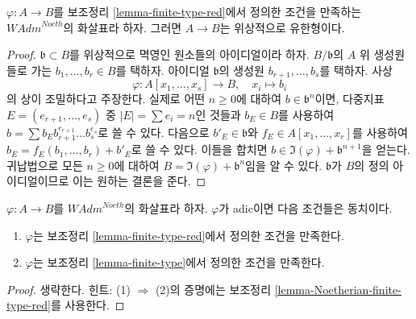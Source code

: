 \begin{lemma}
\label{lemma-Noetherian-finite-type-red}
$\varphi : A \to B$를 보조정리 \ref{lemma-finite-type-red}에서 정의한
조건을 만족하는 $\textit{WAdm}^{Noeth}$의 화살표라 하자.
그러면 $A \to B$는 위상적으로 유한형이다.
\end{lemma}

\begin{proof}
$\mathfrak b \subset B$를 위상적으로 멱영인 원소들의 아이디얼이라 하자.
$B/\mathfrak b$의 $A$ 위 생성원들로 가는 $b_1, \ldots, b_r \in B$를 택하자.
아이디얼 $\mathfrak b$의 생성원 $b_{r + 1}, \ldots, b_s$를 택하자.
사상
$$
\varphi : A[x_1, \ldots, x_s] \longrightarrow B, \quad
x_i \longmapsto b_i
$$
의 상이 조밀하다고 주장한다. 실제로 어떤 $n \geq 0$에 대하여
$b \in \mathfrak b^n$이면, 다중지표
$E = (e_{r + 1}, \ldots, e_s)$ 중 $|E| = \sum e_i = n$인 것들과
$b_E \in B$를 사용하여
$b = \sum b_E b_{r + 1}^{e_{r + 1}} \ldots b_s^{e_s}$로 쓸 수 있다.
다음으로 $b'_E \in \mathfrak b$와 $f_E \in A[x_1, \ldots, x_r]$를 사용하여
$b_E = f_E(b_1, \ldots, b_r) + b'_E$로 쓸 수 있다.
이들을 합치면 $b \in \Im(\varphi) + \mathfrak b^{n + 1}$을 얻는다.
귀납법으로 모든 $n \geq 0$에 대하여
$B = \Im(\varphi) + \mathfrak b^n$임을 알 수 있다.
$\mathfrak b$가 $B$의 정의 아이디얼이므로 이는 원하는 결론을 준다.
\end{proof}

\begin{lemma}
\label{lemma-Noetherian-adic-finite-type-red}
$\varphi : A \to B$를 $\textit{WAdm}^{Noeth}$의 화살표라 하자.
$\varphi$가 adic이면 다음 조건들은 동치이다.
\begin{enumerate}
\item $\varphi$는 보조정리 \ref{lemma-finite-type-red}에서 정의한 조건을 만족한다.
\item $\varphi$는 보조정리 \ref{lemma-finite-type}에서 정의한 조건을 만족한다.
\end{enumerate}
\end{lemma}

\begin{proof}
생략한다. 힌트: (1) $\Rightarrow$ (2)의 증명에는 보조정리
\ref{lemma-Noetherian-finite-type-red}를 사용한다.
\end{proof}

